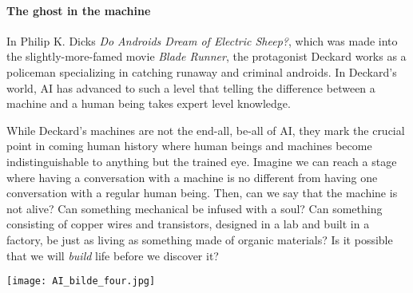 
\paragraph{The ghost in the machine}

In Philip K. Dicks \emph{Do Androids Dream of Electric Sheep?}, which was made into the slightly-more-famed movie \emph{Blade Runner}, the protagonist Deckard works as a policeman specializing in catching runaway and criminal androids. In Deckard's world, AI has advanced to such a level that telling the difference between a machine and a human being takes expert level knowledge.

While Deckard's machines are not the end-all, be-all of AI, they mark the crucial point in coming human history where human beings and machines become indistinguishable to anything but the trained eye.
Imagine we can reach a stage where having a conversation with a machine is no different from having one conversation with a regular human being.
Then, can we say that the machine is not alive?
Can something mechanical be infused with a soul?
Can something consisting of copper wires and transistors, designed in a lab and built in a factory, be just as living as something made of organic materials?
Is it possible that we will \emph{build} life before we discover it?

\begin{center}
	\texttt{[image: AI\_bilde\_four.jpg]}
\end{center}

